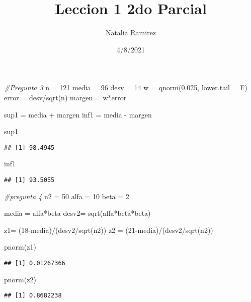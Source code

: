 \documentclass[
]{article}
\title{Leccion 1 2do Parcial}
\author{Natalia Ramirez}
\date{4/8/2021}
\newenvironment{Shaded}{\begin{snugshade}}{\end{snugshade}}
\newcommand{\AttributeTok}[1]{\textcolor[rgb]{0.77,0.63,0.00}{#1}}
\newcommand{\CommentTok}[1]{\textcolor[rgb]{0.56,0.35,0.01}{\textit{#1}}}
\newcommand{\DecValTok}[1]{\textcolor[rgb]{0.00,0.00,0.81}{#1}}
\newcommand{\FloatTok}[1]{\textcolor[rgb]{0.00,0.00,0.81}{#1}}
\newcommand{\FunctionTok}[1]{\textcolor[rgb]{0.00,0.00,0.00}{#1}}
\newcommand{\NormalTok}[1]{#1}
\newcommand{\OtherTok}[1]{\textcolor[rgb]{0.56,0.35,0.01}{#1}}
\newcommand{\SpecialCharTok}[1]{\textcolor[rgb]{0.00,0.00,0.00}{#1}}
\begin{document}
\maketitle

\begin{Shaded}
\begin{Highlighting}[]
\CommentTok{\#Pregunta 3}
\NormalTok{n }\OtherTok{=} \DecValTok{121}
\NormalTok{media }\OtherTok{=} \DecValTok{96}
\NormalTok{desv }\OtherTok{=} \DecValTok{14}
\NormalTok{w }\OtherTok{=} \FunctionTok{qnorm}\NormalTok{(}\FloatTok{0.025}\NormalTok{, }\AttributeTok{lower.tail =}\NormalTok{ F)}
\NormalTok{error }\OtherTok{=}\NormalTok{ desv}\SpecialCharTok{/}\FunctionTok{sqrt}\NormalTok{(n)}
\NormalTok{margen }\OtherTok{=}\NormalTok{ w}\SpecialCharTok{*}\NormalTok{error}

\NormalTok{sup1 }\OtherTok{=}\NormalTok{ media }\SpecialCharTok{+}\NormalTok{ margen}
\NormalTok{inf1 }\OtherTok{=}\NormalTok{ media }\SpecialCharTok{{-}}\NormalTok{ margen}

\NormalTok{sup1}
\end{Highlighting}
\end{Shaded}

\begin{verbatim}
## [1] 98.4945
\end{verbatim}

\begin{Shaded}
\begin{Highlighting}[]
\NormalTok{inf1}
\end{Highlighting}
\end{Shaded}

\begin{verbatim}
## [1] 93.5055
\end{verbatim}

\begin{Shaded}
\begin{Highlighting}[]
\CommentTok{\#pregunta 4}
\NormalTok{n2 }\OtherTok{=} \DecValTok{50}
\NormalTok{alfa }\OtherTok{=} \DecValTok{10}
\NormalTok{beta }\OtherTok{=} \DecValTok{2}

\NormalTok{media }\OtherTok{=}\NormalTok{ alfa}\SpecialCharTok{*}\NormalTok{beta}
\NormalTok{desv2}\OtherTok{=} \FunctionTok{sqrt}\NormalTok{(alfa}\SpecialCharTok{*}\NormalTok{beta}\SpecialCharTok{*}\NormalTok{beta)}

\NormalTok{z1}\OtherTok{=}\NormalTok{ (}\DecValTok{18}\SpecialCharTok{{-}}\NormalTok{media)}\SpecialCharTok{/}\NormalTok{(desv2}\SpecialCharTok{/}\FunctionTok{sqrt}\NormalTok{(n2))}
\NormalTok{z2 }\OtherTok{=}\NormalTok{ (}\DecValTok{21}\SpecialCharTok{{-}}\NormalTok{media)}\SpecialCharTok{/}\NormalTok{(desv2}\SpecialCharTok{/}\FunctionTok{sqrt}\NormalTok{(n2))}

\FunctionTok{pnorm}\NormalTok{(z1)}
\end{Highlighting}
\end{Shaded}

\begin{verbatim}
## [1] 0.01267366
\end{verbatim}

\begin{Shaded}
\begin{Highlighting}[]
\FunctionTok{pnorm}\NormalTok{(z2)}
\end{Highlighting}
\end{Shaded}

\begin{verbatim}
## [1] 0.8682238
\end{verbatim}
\end{document}
